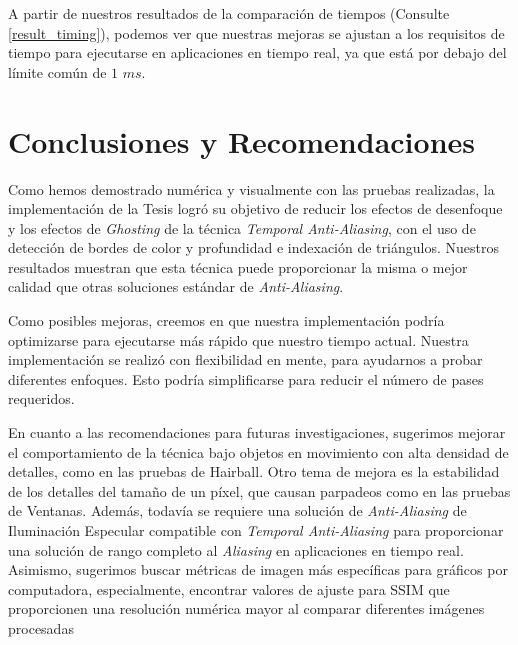 \documentclass[pregrado]{tesis-usb} %
\begin{document}
A partir de nuestros resultados de la comparación de tiempos (Consulte \ref{result_timing}), podemos ver que nuestras mejoras se ajustan a los requisitos de tiempo para ejecutarse en aplicaciones en tiempo real, ya que está por debajo del límite común de $1$ $ms$.


\chapter{Conclusiones y Recomendaciones}
Como hemos demostrado numérica y visualmente con las pruebas realizadas, la implementación de la Tesis logró su objetivo de reducir los efectos de desenfoque y los efectos de \textit{Ghosting} de la técnica \textit{Temporal Anti-Aliasing}, con el uso de detección de bordes de color y profundidad e indexación de triángulos. Nuestros resultados muestran que esta técnica puede proporcionar la misma o mejor calidad que otras soluciones estándar de \textit{Anti-Aliasing}.

Como posibles mejoras, creemos en que nuestra implementación podría optimizarse para ejecutarse más rápido que nuestro tiempo actual. Nuestra implementación se realizó con flexibilidad en mente, para ayudarnos a probar diferentes enfoques. Esto podría simplificarse para reducir el número de pases requeridos.

En cuanto a las recomendaciones para futuras investigaciones, sugerimos mejorar el comportamiento de la técnica bajo objetos en movimiento con alta densidad de detalles, como en las pruebas de Hairball. Otro tema de mejora es la estabilidad de los detalles del tamaño de un píxel, que causan parpadeos como en las pruebas de Ventanas. Además, todavía se requiere una solución de \textit{Anti-Aliasing} de Iluminación Especular compatible con \textit{Temporal Anti-Aliasing} para proporcionar una solución de rango completo al \textit{Aliasing} en aplicaciones en tiempo real. Asimismo, sugerimos buscar métricas de imagen más específicas para gráficos por computadora, especialmente, encontrar valores de ajuste para SSIM que proporcionen una resolución numérica mayor al comparar diferentes imágenes procesadas




\appendix
\end{document}
